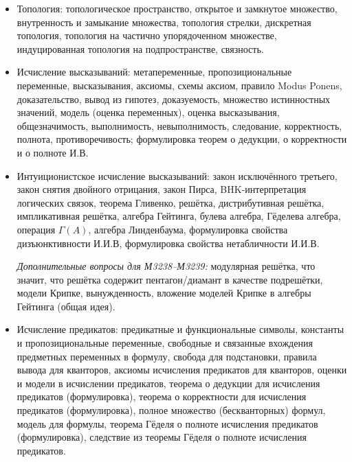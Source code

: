 \documentclass[11pt,a4paper,oneside]{article}
\begin{document}
\begin{itemize}
\item Топология: топологическое пространство,
открытое и замкнутое множество, внутренность и замыкание множества, топология стрелки,
дискретная топология, топология на частично упорядоченном множестве,
индуцированная топология на подпространстве, связность.
\item Исчисление высказываний: метапеременные, пропозициональные переменные,
высказывания, аксиомы, схемы аксиом, правило Modus Ponens, доказательство,
вывод из гипотез, доказуемость, множество истинностных значений, 
модель (оценка переменных), оценка высказывания, общезначимость, 
выполнимость, невыполнимость, следование, корректность, полнота, 
противоречивость; формулировка теорем о дедукции, о корректности и о полноте И.В.
\item Интуиционистское исчисление высказываний: 
закон исключённого третьего, закон снятия двойного отрицания,
закон Пирса, BHK-интер\-пре\-та\-ция логических связок, теорема Гливенко,
решётка, дистрибутивная решётка, импликативная решётка, 
алгебра Гейтинга, булева алгебра, 
Гёделева алгебра, операция $\Gamma(A)$, алгебра Линденбаума,
формулировка свойства дизъюнктивности И.И.В, формулировка свойства нетабличности И.И.В.

\emph{Дополнительные вопросы для М3238--М3239:}
модулярная решётка, что значит, что решётка содержит пентагон/диамант в качестве
подрешётки, модели Крипке, вынужденность, вложение моделей Крипке в алгебры Гейтинга 
(общая идея).
\item Исчисление предикатов:
предикатные и функциональные символы, константы и пропозициональные переменные,
свободные и связанные вхождения предметных переменных в формулу, 
свобода для подстановки, правила вывода для кванторов, аксиомы исчисления предикатов 
для кванторов, оценки и модели в исчислении предикатов, теорема о дедукции для 
исчисления предикатов (формулировка), теорема о корректности для исчисления 
предикатов (формулировка), полное множество (бескванторных) формул, 
модель для формулы, теорема Гёделя о полноте исчисления предикатов (формулировка),
следствие из теоремы Гёделя о полноте исчисления предикатов.
\end{itemize}
\end{document}
